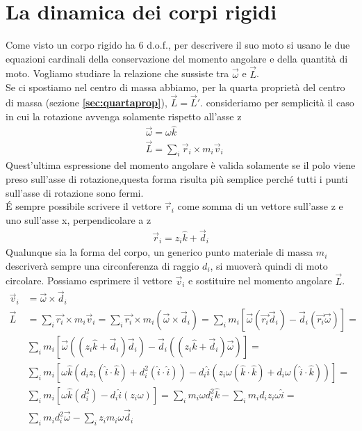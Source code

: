 \documentclass[10pt,a4paper]{article}
\begin{document}
\section{La dinamica dei corpi rigidi}
Come visto un corpo rigido ha 6 d.o.f., per descrivere il suo moto si usano le due equazioni cardinali della conservazione del momento angolare e della quantità di moto. Vogliamo studiare la relazione che sussiste tra $\vec{\omega}$ e $\vec{L}$.\\
Se ci spostiamo nel centro di massa abbiamo, per la quarta proprietà del centro di massa (sezione \textbf{\ref{sec:quartaprop}}), $\vec{L} = \vec{L}'$. consideriamo per semplicità il caso in cui la rotazione avvenga solamente rispetto all'asse z
\begin{align*}
	&\vec{\omega}=\omega \hat{k}\\
	&\vec{L}=\sum_i \vec{r}_i \times m_i \vec{v}_i
\end{align*} 
Quest'ultima espressione del momento angolare è valida solamente se il polo viene preso sull'asse di rotazione,questa forma risulta più semplice perché tutti i punti sull'asse di rotazione sono fermi.\\
\'{E} sempre possibile scrivere il vettore $\vec{r}_i$ come somma di un vettore sull'asse z e uno sull'asse x, perpendicolare a z
\begin{align*}
	\vec{r}_i = z_i \hat{k} + \vec{d}_i
\end{align*}
Qualunque sia la forma del corpo, un generico punto materiale di massa $m_i$ descriverà sempre una circonferenza di raggio $d_i$, si muoverà quindi di moto circolare. Possiamo esprimere il vettore $\vec{v}_i$ e sostituire nel momento angolare $\vec{L}$. 
\begin{align*}
	\vec{v}_i &= \vec{\omega}\times \vec{d}_i\\
	\vec{L} &= \sum_i \vec{r_i} \times m_i \vec{v}_i = \sum_i \vec{r_i} \times m_i (\vec{\omega}\times \vec{d}_i) = \sum_i m_i[\vec{\omega}(\vec{r_i}\vec{d}_i)-\vec{d}_i(\vec{r_i}\vec{\omega})]= \\
	& \sum_i m_i[\vec{\omega}((z_i \hat{k} + \vec{d}_i)\vec{d}_i)-\vec{d}_i((z_i \hat{k} + \vec{d}_i)\vec{\omega})]=\\
	&\sum_i m_i[\omega \hat{k}(d_i z_i (\hat{i} \cdot \hat{k})+d_i^2(\hat{i}\cdot \hat{i}))-d_i \hat{i}(z_i \omega (\hat{k} \cdot \hat{k})+ d_i \omega (\hat{i}\cdot \hat{k}))]=\\
	&\sum_i m_i[\omega \hat{k}(d_i^2)-d_i \hat{i}(z_i \omega)] = \sum_i m_i \omega d_i^2 \hat{k} - \sum_i m_i d_i z_i \omega \hat{i}=\\
	& \sum_i m_i d_i^2 \vec{\omega}- \sum_i z_i m_i \omega \vec{d}_i 
\end{align*} 
\end{document}
